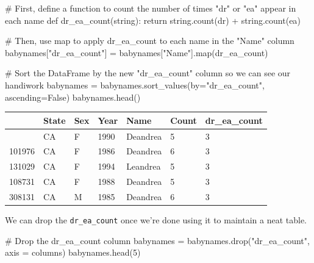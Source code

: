 \documentclass[
  letterpaper,
  DIV=11,
  numbers=noendperiod]{scrreprt}
\newenvironment{Shaded}{\begin{snugshade}}{\end{snugshade}}
\newcommand{\BuiltInTok}[1]{\textcolor[rgb]{0.00,0.23,0.31}{#1}}
\newcommand{\CommentTok}[1]{\textcolor[rgb]{0.37,0.37,0.37}{#1}}
\newcommand{\ControlFlowTok}[1]{\textcolor[rgb]{0.00,0.23,0.31}{#1}}
\newcommand{\DecValTok}[1]{\textcolor[rgb]{0.68,0.00,0.00}{#1}}
\newcommand{\KeywordTok}[1]{\textcolor[rgb]{0.00,0.23,0.31}{#1}}
\newcommand{\NormalTok}[1]{\textcolor[rgb]{0.00,0.23,0.31}{#1}}
\newcommand{\OperatorTok}[1]{\textcolor[rgb]{0.37,0.37,0.37}{#1}}
\newcommand{\StringTok}[1]{\textcolor[rgb]{0.13,0.47,0.30}{#1}}
\newcommand{\VariableTok}[1]{\textcolor[rgb]{0.07,0.07,0.07}{#1}}
\begin{document}
\begin{Shaded}
\begin{Highlighting}[]
\CommentTok{\# First, define a function to count the number of times "dr" or "ea" appear in each name}
\KeywordTok{def}\NormalTok{ dr\_ea\_count(string):}
    \ControlFlowTok{return}\NormalTok{ string.count(}\StringTok{\textquotesingle{}dr\textquotesingle{}}\NormalTok{) }\OperatorTok{+}\NormalTok{ string.count(}\StringTok{\textquotesingle{}ea\textquotesingle{}}\NormalTok{)}

\CommentTok{\# Then, use \textasciigrave{}map\textasciigrave{} to apply \textasciigrave{}dr\_ea\_count\textasciigrave{} to each name in the "Name" column}
\NormalTok{babynames[}\StringTok{"dr\_ea\_count"}\NormalTok{] }\OperatorTok{=}\NormalTok{ babynames[}\StringTok{"Name"}\NormalTok{].}\BuiltInTok{map}\NormalTok{(dr\_ea\_count)}

\CommentTok{\# Sort the DataFrame by the new "dr\_ea\_count" column so we can see our handiwork}
\NormalTok{babynames }\OperatorTok{=}\NormalTok{ babynames.sort\_values(by}\OperatorTok{=}\StringTok{"dr\_ea\_count"}\NormalTok{, ascending}\OperatorTok{=}\VariableTok{False}\NormalTok{)}
\NormalTok{babynames.head()}
\end{Highlighting}
\end{Shaded}

\begin{longtable}[]{@{}lllllll@{}}
\toprule\noalign{}
& State & Sex & Year & Name & Count & dr\_ea\_count \\
\midrule\noalign{}
\endhead
\bottomrule\noalign{}
\endlastfoot
115957 & CA & F & 1990 & Deandrea & 5 & 3 \\
101976 & CA & F & 1986 & Deandrea & 6 & 3 \\
131029 & CA & F & 1994 & Leandrea & 5 & 3 \\
108731 & CA & F & 1988 & Deandrea & 5 & 3 \\
308131 & CA & M & 1985 & Deandrea & 6 & 3 \\
\end{longtable}

We can drop the \texttt{dr\_ea\_count} once we're done using it to
maintain a neat table.

\begin{Shaded}
\begin{Highlighting}[]
\CommentTok{\# Drop the \textasciigrave{}dr\_ea\_count\textasciigrave{} column}
\NormalTok{babynames }\OperatorTok{=}\NormalTok{ babynames.drop(}\StringTok{"dr\_ea\_count"}\NormalTok{, axis }\OperatorTok{=} \StringTok{\textquotesingle{}columns\textquotesingle{}}\NormalTok{)}
\NormalTok{babynames.head(}\DecValTok{5}\NormalTok{)}
\end{Highlighting}
\end{Shaded}
\end{document}
